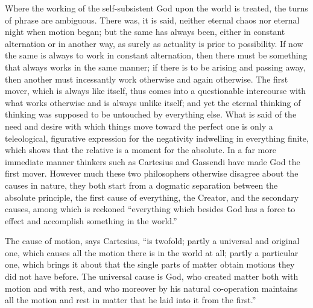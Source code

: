 \documentclass[12pt,a4paper]{book}
\begin{document}
Where the working of the self-subsistent God upon the world is treated, the turns of phrase are
ambiguous. There was, it is said, neither eternal chaos nor eternal night when motion began; but the
same has always been,
either in constant alternation or in another way, as surely as actuality is prior to possibility. If
now the same is always to work in constant alternation, then there must be something that always works
in the same manner; if there is to be arising and passing away, then another must incessantly work
otherwise and again otherwise. The first mover, which is always like itself, thus comes into a
questionable intercourse with what works otherwise and is always unlike itself; and yet the eternal
thinking of thinking was supposed to be untouched by everything else. What is said of the need and
desire with which things move toward the perfect one is only a teleological, figurative expression for
the negativity indwelling in everything finite, which shows that the relative is a moment for the
absolute.
In a far more immediate manner thinkers such as Cartesius and Gassendi have made God the first mover.
However much these two philosophers otherwise disagree about the causes in nature, they both start
from a dogmatic separation between the absolute principle, the first cause of everything, the Creator,
and the secondary causes, among which is reckoned ``everything which besides God has a force to effect
and accomplish something in the world.''

The cause of motion, says Cartesius, ``is twofold; partly a universal and original one, which causes
all the motion there is in the world at all; partly a particular one, which brings it about that the
single parts of matter obtain motions they did not have before. The universal cause is God, who
created matter both with motion and with rest, and who moreover by his natural co-operation maintains
all the motion and rest in matter that he laid into it from the first.''
\end{document}
